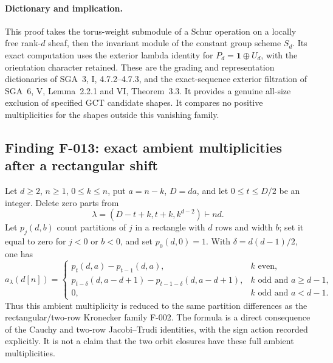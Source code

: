 \paragraph{Dictionary and implication.}
This proof takes the torus-weight submodule of a Schur operation
on a locally free rank-\(d\) sheaf, then the invariant module
of the constant group scheme \(S_d\). Its exact computation
uses the exterior lambda identity for
\(P_d=\mathbf1\oplus U_d\), with the orientation character
retained. These are the grading and representation dictionaries
of SGA~3, I, 4.7.2--4.7.3, and the exact-sequence exterior
filtration of SGA~6, V, Lemma~2.2.1 and VI, Theorem~3.3.
It provides a genuine all-size exclusion of specified GCT
candidate shapes. It compares no positive multiplicities for
the shapes outside this vanishing family.

\subsection*{Finding F-013: exact ambient multiplicities after a rectangular shift}
Let \(d\geq2\), \(n\geq1\), \(0\leq k\leq n\), put
\(a=n-k\), \(D=da\), and let \(0\leq t\leq D/2\) be an integer.
Delete zero parts from
\[
                 \lambda=(D-t+k,t+k,k^{d-2})\vdash nd.
\]
Let \(p_j(d,b)\) count partitions of \(j\) in a rectangle with
\(d\) rows and width \(b\); set it equal to zero for \(j<0\)
or \(b<0\), and set \(p_0(d,0)=1\).
With \(\delta=d(d-1)/2\), one has
\begin{equation}\label{eq:F013}
 a_\lambda(d[n])=
 \begin{cases}
 p_t(d,a)-p_{t-1}(d,a),&k\text{ even},\\
 p_{t-\delta}(d,a-d+1)-p_{t-1-\delta}(d,a-d+1),
       &k\text{ odd and }a\geq d-1,\\
 0,&k\text{ odd and }a<d-1.
 \end{cases}
\end{equation}
Thus this ambient multiplicity is reduced to the same partition
differences as the rectangular/two-row Kronecker family F-002.
The formula is a direct consequence of the Cauchy and two-row
Jacobi--Trudi identities, with the sign action recorded explicitly.
It is not a claim that the two orbit closures have these full
ambient multiplicities.

